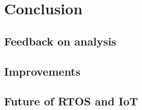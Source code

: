 \part{Conclusion}

\chapter{Feedback on analysis}

\chapter{Improvements}

\chapter{Future of RTOS and IoT}